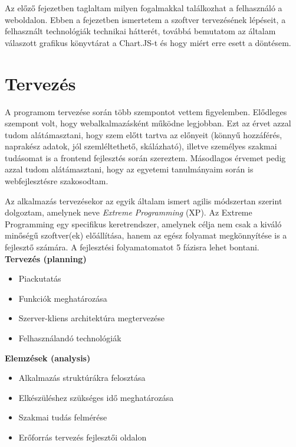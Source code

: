 
Az előző fejezetben taglaltam milyen fogalmakkal találkozhat a felhasználó a weboldalon. Ebben a fejezetben ismertetem a szoftver tervezésének lépéseit, a felhasznált technológiák technikai hátterét, továbbá bemutatom az általam válaszott grafikus könyvtárat a Chart.JS-t és hogy miért erre esett a döntésem.

\section{Tervezés  \label{fig:planning}}

A programom tervezése során több szempontot vettem figyelemben. Elődleges szempont volt, hogy webalkalmazásként működne legjobban. Ezt az érvet azzal tudom alátámasztani, hogy szem előtt tartva az előnyeit (könnyű hozzáférés, naprakész adatok, jól szemléltethető, skálázható), illetve személyes szakmai tudásomat is a frontend fejlesztés során szereztem. Másodlagos érvemet pedig azzal tudom alátámasztani, hogy az egyetemi tanulmányaim során is webfejlesztésre szakosodtam.

	Az alkalmazás tervezésekor az egyik általam ismert agilis módszertan szerint dolgoztam, amelynek neve \emph{Extreme Programming} (XP). Az Extreme Programming egy specifikus keretrendszer, amelynek célja nem csak a kiváló minőségű szoftver(ek) előállítása, hanem az egész folyamat megkönnyítése is a fejlesztő számára.  A fejlesztési folyamatomatot 5 fázisra lehet bontani.\cite{agile} \\

\textbf{Tervezés (planning)}
\begin{itemize}
\item Piackutatás
\item Funkciók meghatározása
\item Szerver-kliens architektúra megtervezése
\item Felhasználandó technológiák
\end{itemize}

\textbf{Elemzések (analysis)}
\begin{itemize}
\item Alkalmazás struktúrákra felosztása
\item Elkészüléshez szükséges idő meghatározása
\item Szakmai tudás felmérése
\item Erőforrás tervezés fejlesztői oldalon
\end{itemize}

